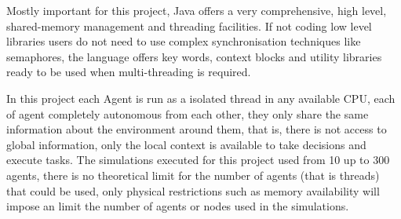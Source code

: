 Mostly important for this project, Java offers a very comprehensive, high level, shared-memory management and threading facilities. If not coding low level libraries users do not need to use complex synchronisation techniques like semaphores, the language offers key words, context blocks and utility libraries ready to be used when multi-threading is required.

In this project each Agent is run as a isolated thread in any available CPU, each of agent completely autonomous from each other, they only share the same information about the environment around them, that is, there is not access to global information, only the local context is available to take decisions and execute tasks. The simulations executed for this project used from 10 up to 300 agents, there is no theoretical limit for the number of agents (that is threads) that could be used, only physical restrictions such as memory availability will impose an limit the number of agents or nodes used in the simulations.